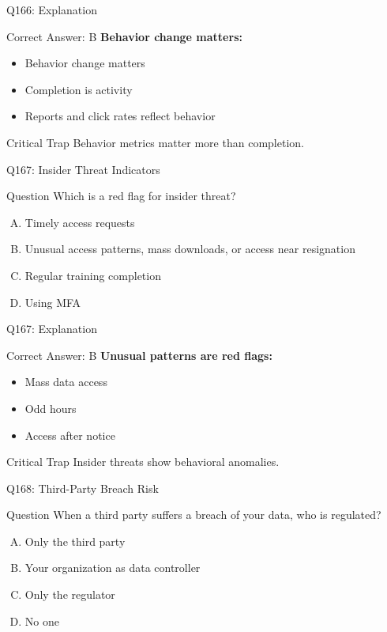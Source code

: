 \documentclass{beamer}
\begin{document}
	\begin{frame}{Q166: Explanation}
		\begin{block}{Correct Answer: B}
			\textbf{Behavior change matters:}
			\begin{itemize}
				\item Behavior change matters
				\item Completion is activity
				\item Reports and click rates reflect behavior
			\end{itemize}
		\end{block}
		\begin{alertblock}{Critical Trap}
			Behavior metrics matter more than completion.
		\end{alertblock}
	\end{frame}
	
	\begin{frame}{Q167: Insider Threat Indicators}
		\begin{block}{Question}
			Which is a red flag for insider threat?
		\end{block}
		\begin{enumerate}[(A)]
			\item Timely access requests
			\item Unusual access patterns, mass downloads, or access near resignation
			\item Regular training completion
			\item Using MFA
		\end{enumerate}
	\end{frame}
	
	\begin{frame}{Q167: Explanation}
		\begin{block}{Correct Answer: B}
			\textbf{Unusual patterns are red flags:}
			\begin{itemize}
				\item Mass data access
				\item Odd hours
				\item Access after notice
			\end{itemize}
		\end{block}
		\begin{alertblock}{Critical Trap}
			Insider threats show behavioral anomalies.
		\end{alertblock}
	\end{frame}
	
	\begin{frame}{Q168: Third-Party Breach Risk}
		\begin{block}{Question}
			When a third party suffers a breach of your data, who is regulated?
		\end{block}
		\begin{enumerate}[(A)]
			\item Only the third party
			\item Your organization as data controller
			\item Only the regulator
			\item No one
		\end{enumerate}
	\end{frame}
	
\end{document}
